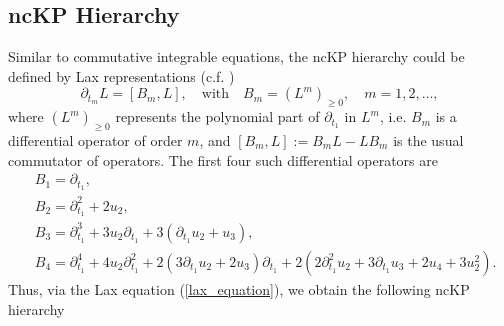 \documentclass[11p,reqno]{amsart}
\numberwithin{equation}{section}
\numberwithin{equation}{section}
\begin{document}
\subsection{ncKP Hierarchy}
Similar to commutative integrable equations, 
the ncKP hierarchy could be defined by Lax representations (c.f. \cite{hamanaka10})
\begin{equation} \label{lax_equation}
    \partial_{t_m} L = \left[B_m, L\right], \quad \mathrm{with} \quad B_m = (L^m)_{\geq 0}, \quad m = 1, 2, \ldots,
\end{equation}
where $(L^m)_{\geq 0}$ represents the polynomial part of $\partial_{t_1}$ in $L^m$, i.e. $B_m$ is a differential operator of order $m$, and $\left[B_m, L\right] := B_m L - L B_m$ is the usual commutator of operators. The first four such
differential operators are
\begin{equation}
    \begin{split}
        &B_1 = \partial_{t_1}, \\
        &B_2 = \partial_{t_1}^2 + 2 u_2, \\
        &B_3 = \partial_{t_1}^3 + 3 u_2 \partial_{t_1} + 3 (\partial_{t_1} u_2 + u_3), \\
        &B_4 = \partial_{t_1}^4 + 4 u_2 \partial_{t_1}^2 + 2 (3\partial_{t_1} u_2 + 2 u_3) \partial_{t_1} + 2 (2 \partial_{t_1}^2 u_2 + 3\partial_{t_1} u_3 + 2 u_4 + 3 u_2^2). 
    \end{split}
\end{equation}
Thus, via the Lax equation (\ref{lax_equation}), we obtain the following ncKP hierarchy
\end{document}
